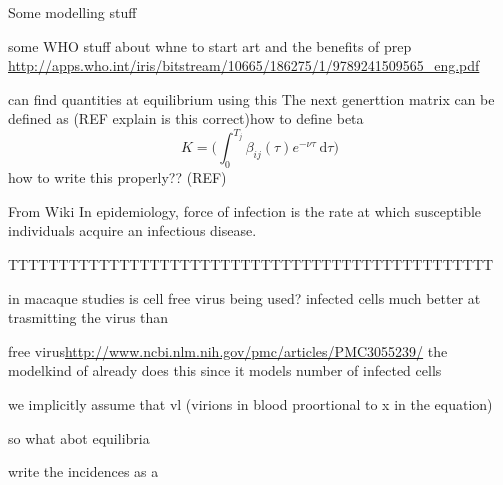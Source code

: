\documentclass[DIV=15]{scrartcl}
\begin{document}
  Some modelling stuff \cite{diekmann1990}
  
  
  
  some WHO stuff about whne to start art and  the benefits of prep
  \url{http://apps.who.int/iris/bitstream/10665/186275/1/9789241509565_eng.pdf}
  
  
can find quantities at equilibrium using this   
  The next generttion  matrix can be defined as (REF explain is this  correct)how to define beta
  \begin{equation}
   K = \big( \int_0^{T_j}\beta_{ij}(\tau) e^{-\nu \tau} \ \text{d} \tau \big)
  \end{equation}
how to write this properly??  (REF)

From Wiki
  In epidemiology, force of infection  is the rate at which susceptible individuals acquire an infectious disease.
  
  
  
  











TTTTTTTTTTTTTTTTTTTTTTTTTTTTTTTTTTTTTTTTTTTTTTTT

in macaque studies is cell  free virus being used?
infected cells much better at trasmitting the virus than 

free virus\url{http://www.ncbi.nlm.nih.gov/pmc/articles/PMC3055239/}  the modelkind of already does this since it models number of infected cells


we implicitly assume that vl (virions in blood proortional to x in the equation)

so  what abot equilibria
 

write the incidences as a
\end{document}
